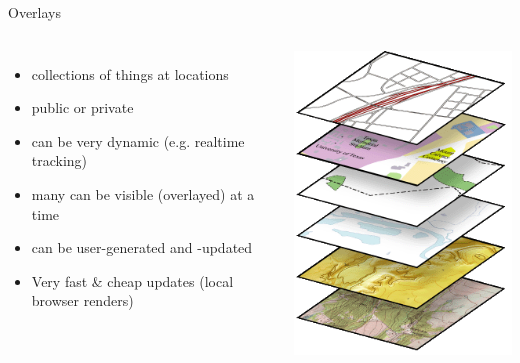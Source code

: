 \documentclass{beamer}
\begin{document}
\begin{frame}{Overlays}
 \begin{columns}
   \begin{itemize}
    \item collections of things at locations
    \item public or private
    \item can be very dynamic (e.g. realtime tracking)
    \item many can be visible (overlayed) at a time
    \item can be user-generated and -updated
    \item Very fast \& cheap updates (local browser renders)
   \end{itemize}
   \includegraphics[scale=0.5]{basemap_layers}
 \end{columns}
\end{frame}
\end{document}

